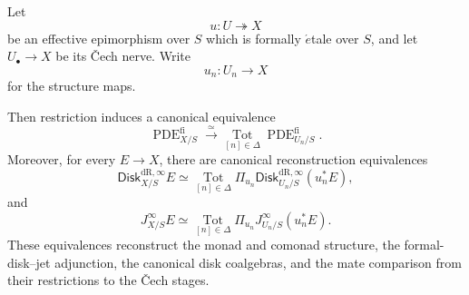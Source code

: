 \begin{theorem}
\label{thm:formally-etale-descent-jets}
Let
\[
  u:U\twoheadrightarrow X
\]
be an effective epimorphism over \(S\) which is formally
\(\acute{e}\)tale over \(S\), and let \(U_\bullet\to X\) be its
\v{C}ech nerve. Write
\[
  u_n:U_n\to X
\]
for the structure maps.

Then restriction induces a canonical equivalence
\[
  \operatorname{PDE}^{\mathrm{fi}}_{X/S}
  \xrightarrow{\simeq}
  \operatorname*{Tot}_{[n]\in\Delta}
  \operatorname{PDE}^{\mathrm{fi}}_{U_n/S}.
\]
Moreover, for every \(E\to X\), there are canonical reconstruction
equivalences
\[
  \mathsf{Disk}^{\mathrm{dR},\infty}_{X/S}E
  \simeq
  \operatorname*{Tot}_{[n]\in\Delta}
  \Pi_{u_n}
  \mathsf{Disk}^{\mathrm{dR},\infty}_{U_n/S}(u_n^*E),
\]
and
\[
  J^\infty_{X/S}E
  \simeq
  \operatorname*{Tot}_{[n]\in\Delta}
  \Pi_{u_n}
  J^\infty_{U_n/S}(u_n^*E).
\]
These equivalences reconstruct the monad and comonad structure, the
formal-disk--jet adjunction, the canonical disk coalgebras, and the mate
comparison from their restrictions to the \v{C}ech stages.
\end{theorem}

